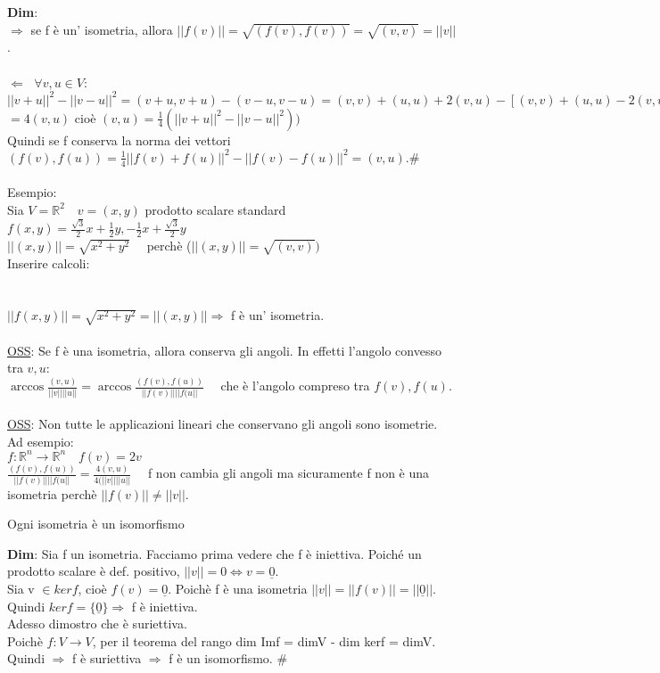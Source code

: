 \documentclass[12pt]{article}
\begin{document}
\noindent \textbf{Dim}:\\
$\Rightarrow$ se f è un' isometria, allora $||f(v)|| = \sqrt{(f(v), f(v))} = \sqrt{(v,v)} = ||v||$.\\\\
$\Leftarrow$ $\; \forall v,u \in V:$\\
$||v+u||^2-||v-u||^2 = (v+u, v+u)-(v-u, v-u) = (v,v)+(u,u) + 2(v,u)-[(v,v)+(u,u)-2(v,u)]$
$=4(v,u)$ cioè $(v,u) = \frac{1}{4}(||v+u||^2-||v-u||^2))$\\
Quindi se f conserva la norma dei vettori $(f(v),f(u)) = \frac{1}{4}||f(v)+f(u)||^2-||f(v)-f(u)||^2 = (v,u). \#$ \\\\
Esempio:\\
Sia $V = \mathbb{R}^2\quad v = (x,y)$ prodotto scalare standard\\
$f(x,y) = \frac{\sqrt{3}}{2}x+\frac{1}{2}y, -\frac{1}{2}x + \frac{\sqrt{3}}{2}y$\\
$||(x,y)|| = \sqrt{x^2+y^2}\quad$ perchè ($||(x,y)|| = \sqrt{(v,v)})$\\
Inserire calcoli:\\
\\\\
$||f(x,y)|| = \sqrt{x^2 + y^2} = ||(x,y)|| \Rightarrow$ f è un' isometria.\\\\
\underline{OSS}: Se f è una isometria, allora conserva gli angoli. In effetti l'angolo convesso tra $v,u$:\\
$\arccos\frac{(v,u)}{||v||||u||} = \arccos\frac{(f(v), f(u))}{||f(v)||||f(u||}\quad$ che è l'angolo compreso tra $f(v),f(u)$.\\\\
\underline{OSS}: Non tutte le applicazioni lineari che conservano gli angoli sono isometrie.\\
Ad esempio:\\
$f:\mathbb{R}^n\rightarrow \mathbb{R}^n\quad f(v) = 2v$\\
$\frac{(f(v), f(u))}{||f(v)||||f(u||} = \frac{4(v,u)}{4(||v||||u||}\quad$ f non cambia gli angoli ma sicuramente f non è una isometria perchè $||f(v)|| \neq ||v||$.\\
\begin{theorem}
    Ogni isometria è un isomorfismo
\end{theorem}
\textbf{Dim}: Sia f un isometria. Facciamo prima vedere che f è iniettiva. Poiché un prodotto scalare è def. positivo, $||v|| = 0 \iff v = \underline{0}$.\\
Sia v $\in kerf$, cioè $f(v) = \underline{0}$. Poichè f è una isometria $||v|| = ||f(v)|| = ||\underline{0}||$.\\
Quindi $kerf = \{\underline{0}\} \Rightarrow$ f è iniettiva.\\
Adesso dimostro che è suriettiva.\\
Poichè $f: V\rightarrow V$, per il teorema del rango dim Imf = dimV - dim kerf = dimV.\\
Quindi $\Rightarrow$ f è suriettiva $\Rightarrow$ f è un isomorfismo. \#\\\\
\end{document}
